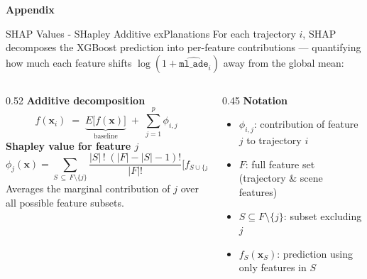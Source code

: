 
\appendix

\begin{frame}
  \begin{center}
    {\Huge \textcolor{lmugreen}{\textbf{Appendix}}}
  \end{center}
\end{frame}


\begin{frame}[noframenumbering]{SHAP Values - SHapley Additive exPlanations}
  \footnotesize
  For each trajectory $i$, SHAP decomposes the XGBoost prediction into
  per-feature contributions — quantifying how much each feature
  shifts $\log(1+\widehat{\texttt{ml\_ade}}_i)$ away from the global mean:
  \vspace{0.2em}
  \begin{columns}[T]
    \begin{column}{0.52\textwidth}
      \textbf{Additive decomposition}
      \[
        f(\mathbf{x}_i) \;=\;
        \underbrace{E\bigl[f(\mathbf{x})\bigr]}_{\text{baseline}}
        \;+\; \sum_{j=1}^{p} \phi_{i,j}
      \]
      \vspace{0.1em}
      \textbf{Shapley value for feature $j$}
      \[
        \phi_j(\mathbf{x}) =
        \!\!\!\sum_{S\,\subseteq\, F\setminus\{j\}}
        \frac{|S|\,!\;(|F|-|S|-1)!}{|F|!}
        \bigl[
          f_{S\cup\{j\}}(\mathbf{x}_{S\cup\{j\}}) - f_S(\mathbf{x}_S)
        \bigr]
      \]
      \vspace{-0.3em}
      \scriptsize Averages the marginal contribution of $j$ over all
      possible feature subsets.
    \end{column}
    \begin{column}{0.45\textwidth}
      \textbf{Notation}
      \begin{itemize}\setlength\itemsep{0.18em}
        \item $\phi_{i,j}$: contribution of feature $j$ to trajectory $i$
        \item $F$: full feature set (trajectory \& scene features)
        \item $S \subseteq F\setminus\{j\}$: subset excluding $j$
        \item $f_S(\mathbf{x}_S)$: prediction using only features in $S$

\end{itemize}
\end{column}
\end{columns}
\end{frame}

